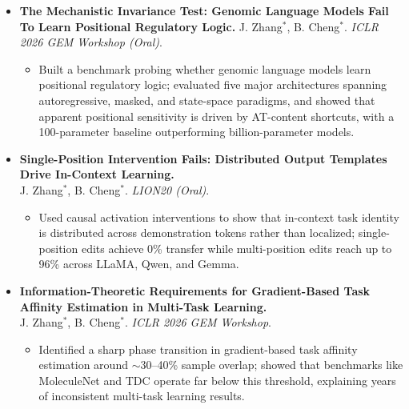 \documentclass[letterpaper,11pt]{article}
\begin{document}
\begin{itemize}[leftmargin=0.15in, label={}, itemsep=5pt, topsep=2pt]
    \small
    \item \textbf{The Mechanistic Invariance Test: Genomic Language Models Fail To Learn Positional Regulatory Logic.} J. Zhang$^{*}$, B. Cheng$^{*}$. \emph{ICLR 2026 GEM Workshop (Oral)}.
        \begin{itemize}[leftmargin=0.2in, itemsep=0pt, topsep=2pt]
            \item Built a benchmark probing whether genomic language models learn positional regulatory logic; evaluated five major architectures spanning autoregressive, masked, and state-space paradigms, and showed that apparent positional sensitivity is driven by AT-content shortcuts, with a 100-parameter baseline outperforming billion-parameter models.
        \end{itemize}

    \item \textbf{Single-Position Intervention Fails: Distributed Output Templates Drive In-Context Learning.} \\
    J. Zhang$^{*}$, B. Cheng$^{*}$. \emph{LION20 (Oral)}.
        \begin{itemize}[leftmargin=0.2in, itemsep=0pt, topsep=2pt]
            \item Used causal activation interventions to show that in-context task identity is distributed across demonstration tokens rather than localized; single-position edits achieve 0\% transfer while multi-position edits reach up to 96\% across LLaMA, Qwen, and Gemma.
        \end{itemize}

    \item \textbf{Information-Theoretic Requirements for Gradient-Based Task Affinity Estimation in Multi-Task Learning.} \\
    J. Zhang$^{*}$, B. Cheng$^{*}$. \emph{ICLR 2026 GEM Workshop}.
        \begin{itemize}[leftmargin=0.2in, itemsep=0pt, topsep=2pt]
            \item Identified a sharp phase transition in gradient-based task affinity estimation around $\sim$30--40\% sample overlap; showed that benchmarks like MoleculeNet and TDC operate far below this threshold, explaining years of inconsistent multi-task learning results.
        \end{itemize}

\end{itemize}
\end{document}

